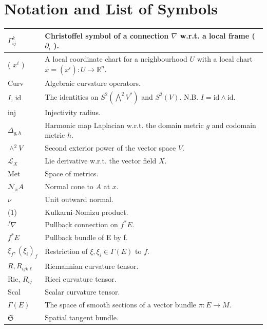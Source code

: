 \documentclass[10pt, letterpaper]{article}
\begin{document}
\pagebreak

\section*{Notation and List of Symbols}


\begin{center}
\begin{tabular}{|l|l|}
\hline
$\Gamma_{i j}^{k}$ & Christoffel symbol of a connection $\nabla$ w.r.t. a local frame ( $\partial_{i}$ ). \\
\hline
( $x^{i}$ ) & A local coordinate chart for a neighbourhood $U$ with a local chart $x=\left(x^{i}\right): U \rightarrow \mathbb{R}^{n}$. \\
\hline
Curv & Algebraic curvature operators. \\
\hline
$I$, id & The identities on $S^{2}\left(\bigwedge^{2} V^{*}\right)$ and $S^{2}(V)$. N.B. $I=\mathrm{id} \wedge \mathrm{id}$. \\
\hline
inj & Injectivity radius. \\
\hline
$\Delta_{g, h}$ & Harmonic map Laplacian w.r.t. the domain metric $g$ and codomain metric $h$. \\
\hline
$\wedge^{2} V$ & Second exterior power of the vector space $V$. \\
\hline
$\mathcal{L}_{X}$ & Lie derivative w.r.t. the vector field $X$. \\
\hline
Met & Space of metrics. \\
\hline
$\mathcal{N}_{x} A$ & Normal cone to $A$ at $x$. \\
\hline
$\nu$ & Unit outward normal. \\
\hline
(1) & Kulkarni-Nomizu product. \\
\hline
${ }^{f} \nabla$ & Pullback connection on $f^{*} E$. \\
\hline
$f^{*} E$ & Pullback bundle of E by f. \\
\hline
$\xi_{f},\left(\xi_{i}\right)_{f}$ & Restriction of $\xi, \xi_{i} \in \Gamma(E)$ to $f$. \\
\hline
$R, R_{i j k \ell}$ & Riemannian curvature tensor. \\
\hline
Ric, $R_{i j}$ & Ricci curvature tensor. \\
\hline
Scal & Scalar curvature tensor. \\
\hline
$\Gamma(E)$ & The space of smooth sections of a vector bundle $\pi: E \rightarrow M$. \\
\hline
$\mathfrak{S}$ & Spatial tangent bundle. \\

\end{tabular}
\end{center}
\end{document}
